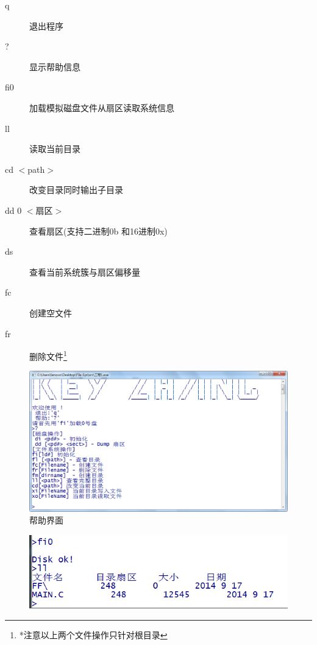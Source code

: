 \documentclass{report}
\begin{document}
\begin{CJK}{GBK}{hei}
\begin{description}
  \item[q\hspace{3.5em}] 退出程序
  \item[?\hspace{3.5em}] 显示帮助信息
  \item[fi0\hspace{3em}] 加载模拟磁盘文件从扇区读取系统信息
  \item[ll\hspace{3.5em}] 读取当前目录
  \item[cd $<$path$>$     ] 改变目录同时输出子目录
  \item[dd 0 $<$扇区$>$] 查看扇区(支持二进制0b 和16进制0x)
  \item[ds\hspace{3.5em}] 查看当前系统簇与扇区偏移量
  \item[fc\hspace{3.5em}] 创建空文件
  \item[fr\hspace{3.5em}] 删除文件\footnote{*注意以上两个文件操作只针对根目录}
\end{description}
  \begin{figure}
  \centering
  \includegraphics[width=\textwidth]{help.jpg}
  \caption{帮助界面}
  \label{}
  \end{figure}
  \begin{figure}
  \centering
  \includegraphics[width=\textwidth]{ll.jpg}

\end{figure}
\end{CJK}
\end{document}
